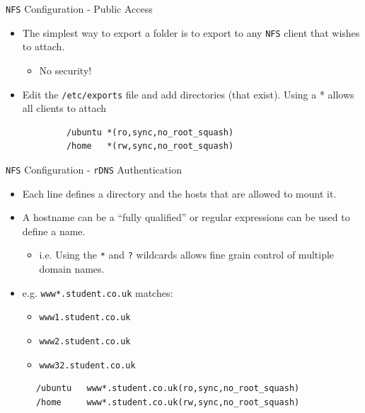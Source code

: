 \documentclass[xcolor=table]{beamer}
\begin{document}
\begin{frame}[fragile]{\texttt{NFS} Configuration - Public Access}
  \begin{itemize}
    \item The simplest way to export a folder is to export to any \texttt{NFS} client that wishes to attach.
      \begin{itemize}
        \item No security!
      \end{itemize}
    \item Edit the \texttt{/etc/exports} file and add directories (that exist). Using a * allows all clients to attach
  \end{itemize}
  \begin{tcolorbox}
    \lstset{
      basicstyle=\tiny\ttfamily,
    }
    \begin{lstlisting}
            /ubuntu	*(ro,sync,no_root_squash)
            /home 	*(rw,sync,no_root_squash)
    \end{lstlisting}
  \end{tcolorbox}
\end{frame}

\begin{frame}[fragile]{\texttt{NFS} Configuration - \texttt{rDNS} Authentication}
  \begin{itemize}
    \item Each line defines a directory and the hosts that are allowed to mount it. 
    \item A hostname can be a ``fully qualified'' or regular expressions can be used to define a name.
      \begin{itemize}
        \item i.e. Using the \texttt{*} and \texttt{?} wildcards allows fine grain control of multiple domain names.
      \end{itemize}
    \item e.g. \texttt{www*.student.co.uk} matches:
      \begin{itemize}
        \item \texttt{www1.student.co.uk}
        \item \texttt{www2.student.co.uk}
        \item \texttt{www32.student.co.uk}
      \end{itemize}
  \end{itemize}
  \begin{tcolorbox}
    \lstset{
      basicstyle=\tiny\ttfamily,
    }
    \begin{lstlisting}
      /ubuntu	www*.student.co.uk(ro,sync,no_root_squash)
      /home 	www*.student.co.uk(rw,sync,no_root_squash)
    \end{lstlisting}
  \end{tcolorbox}
\end{frame}
\end{document}
